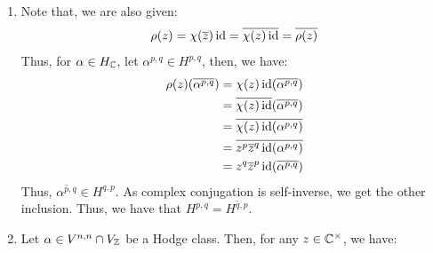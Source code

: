 \documentclass[12pt]{article}
\begin{document}
\begin{solution}
\begin{enumerate}
        For $z \in \C^\times$, we can write $z = (z\overline z)^{1/2}e^{i\theta}$. Then, we have: 
        \begin{align*}
            \chi(z) &= \chi((z\overline z)^{1/2}e^{i\theta}) \\
            &= \chi(z\overline z)^{1/2}\chi(e^{i\theta}) \\
            &= (z^k\overline z^k)^{1/2}e^{im\theta}
        \end{align*}
        Then (Henry helped with this part), we compute:
        \begin{align*}
            \chi(z) &= (z^{k-m}\overline z^{k-m})^{1/2}(z^m\overline z^m)^{1/2}e^{im\theta} \\
            &= (z^{k-m}\overline z^{k-m})^{1/2}z^m \\
            &= \overline z^{(k-m)/2}z^{(k+m)/2} \\
        \end{align*}
        Thus, we can set $p:= (k+m)/2$ and $q := (k-m)/2$. We only need to show that $p, q \in \Z$. Note that, since $\chi(t) = t^k$ for $t \in \R^\times$,:
        \begin{align*}
            \chi(-1) &= (-1)^k = 1^ke^{im\pi}
        \end{align*}
        Thus, $m \equiv k \pmod 2$. Thus, $p, q \in \Z$ and we finally have:
        \[ \chi(z) = z^p\overline z^q\]
        \item Note that, we are also given:
        \[ \rho(z) = \chi(\overline z)\operatorname{id} = \overline{\chi(z)\operatorname{id}} = \overline{\rho(z)} \]
        Thus, for $\alpha \in H_\mathbb C$, let $\alpha^{p,q} \in H^{p,q}$, then, we have:
        \begin{align*}
            \rho(z)(\overline{\alpha^{p,q}}) &= \chi( z)\operatorname{id}(\overline{\alpha^{p, q}})\\
            &= \overline{\chi(z)\operatorname{id}}(\overline{\alpha^{p, q}}) \\
            &= \overline{\chi(z)\operatorname{id}(\alpha^{p,q})} \\
            &= \overline{z^p \overline z^q \operatorname{id}(\alpha^{p, q})} \\
            &= z^q \overline z^p \operatorname{id}(\overline{\alpha^{p,q}})
        \end{align*}
        Thus, $\overline{\alpha^{p,q}} \in H^{q,p}$. As complex conjugation is self-inverse, we get the other inclusion. Thus, we have that $H^{p,q} = \overline{H^{q,p}}$.
        \item Let $\alpha \in V^{n, n} \cap V_\mathbb Z$ be a Hodge class. Then, for any $z \in \C^\times$, we have:

\end{enumerate}
\end{solution}
\end{document}
